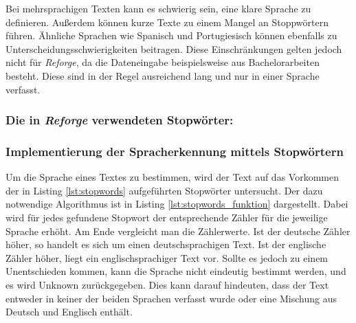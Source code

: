 Bei mehrsprachigen Texten kann es schwierig sein, eine klare Sprache zu definieren. Außerdem können kurze Texte zu einem Mangel an Stoppwörtern führen. Ähnliche Sprachen wie Spanisch und Portugiesisch können ebenfalls zu Unterscheidungsschwierigkeiten beitragen. Diese Einschränkungen gelten jedoch nicht für \textit{Reforge}, da die Dateneingabe beispielsweise aus Bachelorarbeiten besteht. Diese sind in der Regel ausreichend lang und nur in einer Sprache verfasst. 

\subsubsection{Die in \textit{Reforge} verwendeten Stopwörter:}


\subsubsection{Implementierung der Spracherkennung mittels Stopwörtern}

Um die Sprache eines Textes zu bestimmen, wird der Text auf das Vorkommen der in Listing \ref{lst:stopwords} aufgeführten Stopwörter untersucht. Der dazu notwendige Algorithmus ist in Listing \ref{lst:stopwords_funktion} dargestellt.  Dabei wird für jedes gefundene Stopwort der entsprechende Zähler für die jeweilige Sprache erhöht. Am Ende vergleicht man die Zählerwerte. Ist der deutsche Zähler höher, so handelt es sich um einen deutschsprachigen Text. Ist der englische Zähler höher, liegt ein englischsprachiger Text vor. Sollte es jedoch zu einem Unentschieden kommen, kann die Sprache nicht eindeutig bestimmt werden, und es wird Unknown zurückgegeben. Dies kann darauf hindeuten, dass der Text entweder in keiner der beiden Sprachen verfasst wurde oder eine Mischung aus Deutsch und Englisch enthält.


